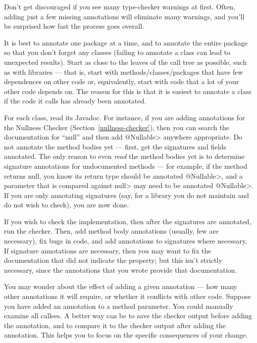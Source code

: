Don't get discouraged if you see many type-checker warnings at first.
Often, adding just a few missing annotations will eliminate many warnings,
and you'll be surprised how fast the process goes overall.

It is best to annotate one package at a time,
and to annotate the entire package so that you don't forget any classes
(failing to annotate a class can lead to unexpected results).
Start as close to the leaves of the call tree as possible, such as with
libraries --- that is,
start with methods/classes/packages that have few dependences on other
code or, equivalently, start with code that a lot of your other code
depends on.  The reason for this is that it is
easiest to annotate a class if the code it calls has already been
annotated.

For each class, read its Javadoc.  For instance, if you are adding
annotations for the Nullness Checker (Section~\ref{nullness-checker}), then
you can search the documentation for ``null'' and then add \<@Nullable>
anywhere appropriate.  Do not annotate the method bodies yet ---
first, get the signatures and fields annotated.  The only reason to even
\emph{read} the method bodies yet is to determine signature annotations for
undocumented methods ---
for example, if the method returns null, you know its return type should be
annotated \<@Nullable>, and a parameter that is compared against \<null>
may need to be annotated \<@Nullable>.  If you are only annotating
signatures (say, for a library you do not maintain and do not wish to
check), you are now done.

If you wish to check the implementation, then after the signatures are
annotated, run the checker.  Then, add method body annotations (usually,
few are necessary), fix bugs in code, and add annotations to signatures
where necessary.  If signature annotations are necessary, then you may want
to fix the documentation that did not indicate the property; but this isn't
strictly necessary, since the annotations that you wrote provide that
documentation.

You may wonder about the effect of adding a given annotation --- how many
other annotations it will require, or whether it conflicts with other code.
Suppose you have added an annotation to a method parameter.  You could
manually examine all callees.  A better way can be to save the checker
output before adding the annotation, and to compare it to the checker
output after adding the annotation.  This helps you to focus on the
specific consequences of your change.

